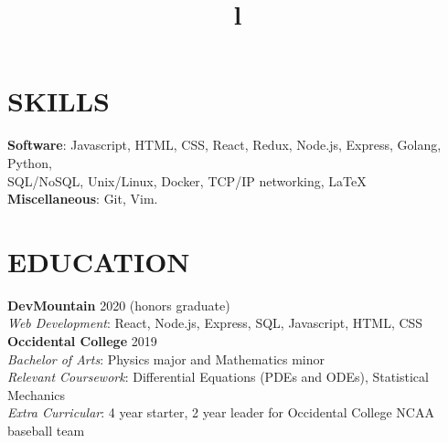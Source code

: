 \documentclass[margin]{res}
\begin{document}
\begin{resume}

\section{SKILLS}

\textbf{Software}: Javascript, HTML, CSS, React, Redux, Node.js, Express, Golang, Python,\\
SQL/NoSQL, Unix/Linux, Docker, TCP/IP networking, \LaTeX\\
\textbf{Miscellaneous}: Git, Vim.

\section{EDUCATION}
\textbf{DevMountain} 2020 (honors graduate)\\
{\sl Web Development}: React, Node.js, Express, SQL, Javascript, HTML, CSS\\
\textbf{Occidental College} 2019\\
{\sl Bachelor of Arts}: Physics major and Mathematics minor\\
{\sl Relevant Coursework}: Differential Equations (PDEs and ODEs), Statistical Mechanics\\
{\sl Extra Curricular}: 4 year starter, 2 year leader for Occidental College NCAA baseball team


\begin{format}
\title{l}\\
\\
\body\\
\end{format}


\end{resume}
\end{document}
